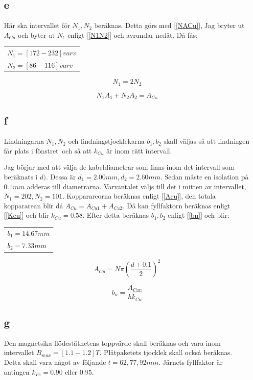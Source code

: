 \documentclass{article}
\begin{document}
\subsection{e}
Här ska intervallet för $N_1,N_2$ beräknas.
Detta görs med [\ref{NACu}], Jag bryter ut $A_{Cu}$ och byter ut $N_1$ enligt [\ref{N1N2}] och avrundar nedåt.
Då fås:

\begin{tabular}{|l}
  $N_1=[ 172 - 232]  varv$\\
  $N_2=[ 86 - 116]  varv$\\
\end{tabular}

\begin{equation}
  N_1=2N_2
  \label{N1N2}
\end{equation}

\begin{equation}
  N_1A_1+N_2A_2=A_{Cu}
  \label{NACu}
\end{equation}


\subsection{f}
Lindningarna $N_1,N_2$ och lindningstjocklekarna $b_1,b_2$ skall väljas så att lindningen får plats i fönstret\
och så att $k_{Cu}$ är inom rätt intervall.

Jag börjar med att välja de kabeldiametrar som finns inom det intervall som beräknats i $d)$.
Dessa är $d_1=2.00 mm,d_2=2.60 mm$.
Sedan måste en isolation på $0.1 mm$ adderas till diametrarna.
Varvantalet väljs till det i mitten av intervallet, $N_1=202, N_2=101$.
Kopparareorna beräknas enligt [\ref{Acu}], den totala koppararean blir då $A_{Cu}=A_{Cu1}+A_{Cu2}$.
Då kan fyllfaktorn beräknas enligt [\ref{Kcu}] och blir $k_{Cu}= 0.58$.
Efter detta beräknas $b_1,b_2$ enligt [\ref{bn}] och blir:
\begin{tabular}{|l}
  $b_1=14.67 mm$\\
  $b_2=7.33 mm$\\
\end{tabular}


\begin{equation}
  A_{Cu}=N\pi(\frac{d+0.1}{2})^2
 \label{Acu}
 \end{equation}

\begin{equation}
  b_n=\frac{A_{Cun}}{h k_{Cu}}
  \label{bn}
\end{equation}

\subsection{g}
Den magnetsika flödestäthetens toppvärde skall beräknas och vara inom intervallet $B_{max}=[1.1 - 1.2] T$.
Plåtpaketets tjocklek skall också beräknas.
Detta skall vara något av följande $t = 62, 77, 92 mm$.
Järnets fyllfaktor är antingen $k_{Fe}=0.90$ eller $0.95$.
\end{document}
